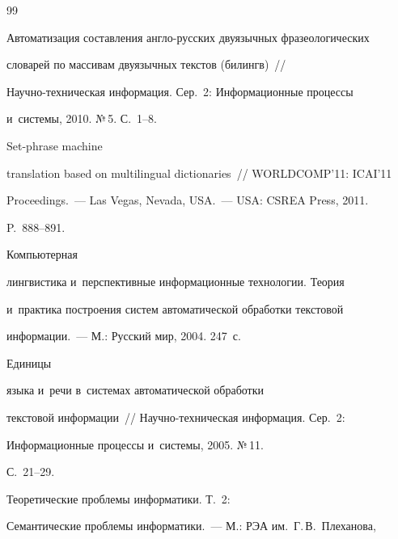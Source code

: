 {{\begin{thebibliography}{99}




Автоматизация составления англо-русских двуязычных фразеологических 


словарей по массивам двуязычных текстов (билингв)~/\!\!/  


Научно-техническая информация. Сер.~2: Информационные процессы 


и~системы, 2010. №\,5. С.~1--8.







 Set-phrase machine 


translation based on multilingual dictionaries~/\!\!/ WORLDCOMP'11: ICAI'11 


Proceedings.~--- Las Vegas, Nevada, USA.~--- USA: CSREA Press, 2011.  


P.~888--891.







 Компьютерная 


лингвистика и~перспективные информационные технологии. Теория 


и~практика построения сис\-тем автоматической обработки текстовой 


информации.~--- М.: Русский мир, 2004. 247~с.







 Единицы 


языка и~речи в~системах автоматической обработки 


текстовой информации~/\!\!/ Научно-техническая информация. Сер.~2: 


Информационные процессы и~системы, 2005. №\,11. 


С.~21--29.







 Теоретические проб\-ле\-мы информатики. Т.~2: 


Семантические проблемы информатики.~--- М.: РЭА им.\ Г.\,В.~Плеханова, 



\end{thebibliography}}}
